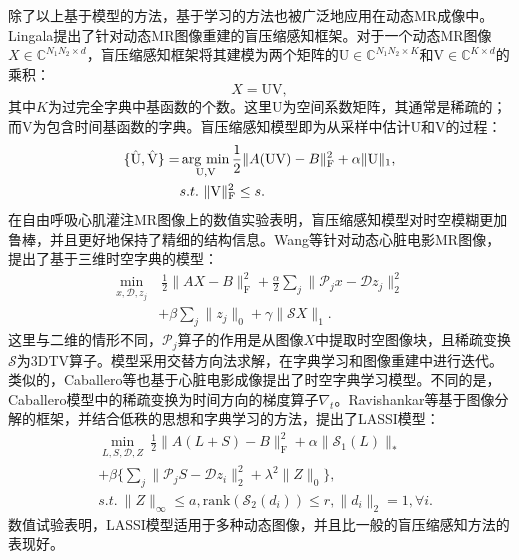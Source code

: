 除了以上基于模型的方法，基于学习的方法也被广泛地应用在动态MR成像中。Lingala\cite{lingala2013blind}提出了针对动态MR图像重建的盲压缩感知框架。对于一个动态MR图像$X\in \mathbb{C}^{N_1N_2\times d}$，盲压缩感知框架将其建模为两个矩阵的$\mathrm{U}\in \mathbb{C}^{N_1N_2\times K}$和$\mathrm{V}\in \mathbb{C}^{K\times d}$的乘积：
$$X=\mathrm{UV},$$
其中$K$为过完全字典中基函数的个数。这里$\mathrm{U}$为空间系数矩阵，其通常是稀疏的；而$\mathrm{V}$为包含时间基函数的字典。盲压缩感知模型即为从采样中估计$\mathrm{U}$和$\mathrm{V}$的过程：
\begin{equation}
\begin{aligned}
	\{\hat{\mathrm{U}},\hat{\mathrm{V}}\}=&\argmin_{\mathrm{U},\mathrm{V}}\frac{1}{2}\|A(\mathrm{UV})-B\|_\mathrm{F}^2+\alpha\|\mathrm{U}\|_1,\\
	&s.t.\ \|\mathrm{V}\|_\mathrm{F}^2\leq s.
\end{aligned}
\end{equation}
在自由呼吸心肌灌注MR图像上的数值实验表明，盲压缩感知模型对时空模糊更加鲁棒，并且更好地保持了精细的结构信息。Wang\cite{wang2013compressed}等针对动态心脏电影MR图像，提出了基于三维时空字典的模型：
\begin{equation}
	\begin{aligned}
		\min_{x,\mathcal{D},z_j}&\ \frac{1}{2}\|AX-B\|_\mathrm{F}^2+\frac{\alpha}{2}\sum_j\|\mathcal{P}_jx-\mathcal{D}z_j\|_2^2\\
		&+\beta\sum_j\|z_j\|_0+\gamma\|\mathcal{S}X\|_1.
	\end{aligned}
\end{equation}
这里与二维的情形不同，$\mathcal{P}_j$算子的作用是从图像$X$中提取时空图像块，且稀疏变换$\mathcal{S}$为3DTV算子。模型采用交替方向法求解，在字典学习和图像重建中进行迭代。类似的，Caballero等\cite{caballero2014dictionary}也基于心脏电影成像提出了时空字典学习模型。不同的是，Caballero模型中的稀疏变换为时间方向的梯度算子$\nabla_t$。Ravishankar等\cite{ravishankar2015efficient}基于图像分解的框架，并结合低秩的思想和字典学习的方法，提出了LASSI模型：
\begin{equation}
	\begin{aligned}
		&\min_{L,S,\mathcal{D},Z}\ \frac{1}{2}\|A(L+S)-B\|_\mathrm{F}^2+\alpha\|\mathcal{S}_1(L)\|_*\\
		&+\beta\{\sum_j\|\mathcal{P}_jS-\mathcal{D}z_i\|^2_2+\lambda^2\|Z\|_0\},\\
		& s.t. \ \|Z\|_\infty\leq a, \mathrm{rank}(\mathcal{S}_2(d_i))\leq r, \|d_i\|_2=1,\forall i.
	\end{aligned}
\end{equation}
数值试验表明，LASSI模型适用于多种动态图像，并且比一般的盲压缩感知方法的表现好。

